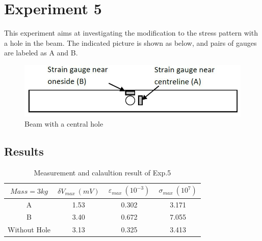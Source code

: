\documentclass[11pt,a4paper,twoside]{article}
\begin{document}
\section{Experiment 5}
This experiment aims at investigating the modification to the stress pattern with a hole in the beam. The indicated picture is shown as below, and pairs of gauges are labeled as A and B. 

\begin{figure}[!h]
	\centering
	\includegraphics[width=0.6\linewidth]{9}
	\caption{Beam with a central hole}
	\label{f9}
\end{figure}

\subsection{Results}

\begin{table}[!h]
	\centering
	\begin{tabular}{|c||c|c|c|}
		\hline
		$Mass=3kg$ & $\delta V_{max} \ (mV)$ & $\ \varepsilon_{max} \ (10^{-3}) \ $ & $\sigma_{max} \ (10^{7})$ \\
		\hline\hline
		A & 1.53 & 0.302 &3.171 \\
		\hline
		B & 3.40 & 0.672 &7.055\\
		\hline
		Without Hole & 3.13 & 0.325 &3.413 \\
		\hline
	\end{tabular}
	\caption{Measurement and calaultion result of Exp.5}
	\label{t6}
\end{table}

\pagebreak
\end{document}
